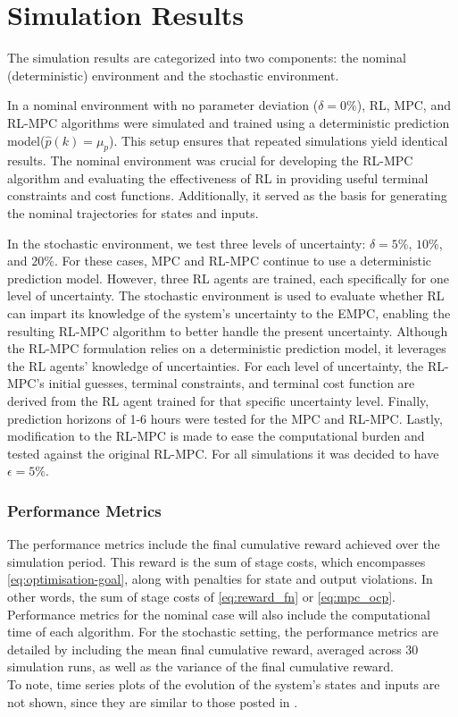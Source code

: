 \section{Simulation Results}
The simulation results are categorized into two components: the nominal (deterministic) environment and the stochastic environment.


In a nominal environment with no parameter deviation ($\delta = 0\%$), RL, MPC, and RL-MPC algorithms were simulated and trained using a deterministic prediction model($\hat{p}(k) = \mu_p$). This setup ensures that repeated simulations yield identical results. The nominal environment was crucial for developing the RL-MPC algorithm and evaluating the effectiveness of RL in providing useful terminal constraints and cost functions. Additionally, it served as the basis for generating the nominal trajectories for states and inputs.

In the stochastic environment, we test three levels of uncertainty: $\delta = 5\%$, $10\%$, and $20\%$. For these cases, MPC and RL-MPC continue to use a deterministic prediction model. However, three RL agents are trained, each specifically for one level of uncertainty. The stochastic environment is used to evaluate whether RL can impart its knowledge of the system's uncertainty to the EMPC, enabling the resulting RL-MPC algorithm to better handle the present uncertainty. Although the RL-MPC formulation relies on a deterministic prediction model, it leverages the RL agents’ knowledge of uncertainties. For each level of uncertainty, the RL-MPC’s initial guesses, terminal constraints, and terminal cost function are derived from the RL agent trained for that specific uncertainty level. Finally, prediction horizons of 1-6 hours were tested for the MPC and RL-MPC. Lastly, modification to the RL-MPC is made to ease the computational burden and tested against the original RL-MPC. For all simulations it was decided to have $\epsilon = 5\%$.

\subsubsection{Performance Metrics}
The performance metrics include the final cumulative reward achieved over the simulation period. This reward is the sum of stage costs, which encompasses \autoref{eq:optimisation-goal}, along with penalties for state and output violations. In other words, the sum of stage costs of \autoref{eq:reward_fn} or \autoref{eq:mpc_ocp}. Performance metrics for the nominal case will also include the computational time of each algorithm. For the stochastic setting, the performance metrics are detailed by including the mean final cumulative reward, averaged across 30 simulation runs, as well as the variance of the final cumulative reward.\\
To note, time series plots of the evolution of the system's states and inputs are not shown, since they are similar to those posted in \cite{morcegoReinforcementLearningModel2023, jansenOptimalControlLettuce2023, boersmaRobustSamplebasedModel2022}.


